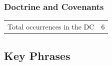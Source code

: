 	
		
		
	\subsubsection{Doctrine and Covenants} %
		\label{BOWELS-DC}
	
		\begin{tabular}{ll}
			Total occurrences in the DC & 6
		\end{tabular}
		
		\begin{compactdesc}
			\item[{\hyperref[DC121-3]{DC 121:3}}]
			\item[{\hyperref[DC121-4]{DC 121:4}}]
			\item[{\hyperref[DC121-45]{DC 121:45}}]
		\end{compactdesc}
		
	
		
		
\subsection{Key Phrases} %
	\label{BOWELS-PHRASES}


